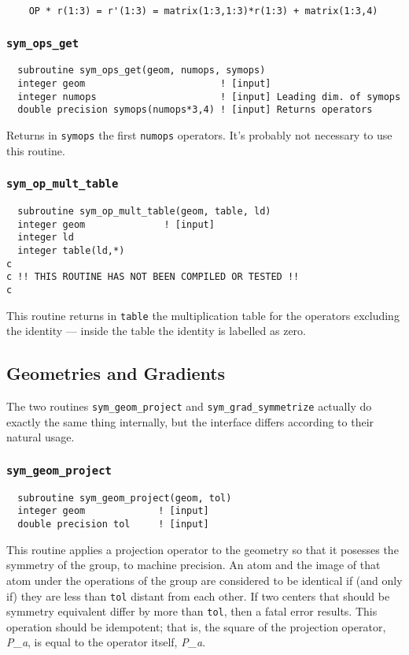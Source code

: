 \begin{verbatim}
    OP * r(1:3) = r'(1:3) = matrix(1:3,1:3)*r(1:3) + matrix(1:3,4)
\end{verbatim}

\subsubsection{{\tt sym\_ops\_get}}
\begin{verbatim}
  subroutine sym_ops_get(geom, numops, symops)
  integer geom                        ! [input]
  integer numops                      ! [input] Leading dim. of symops
  double precision symops(numops*3,4) ! [input] Returns operators
\end{verbatim}
Returns in \verb+symops+ the first \verb+numops+ operators.  It's 
probably not necessary to use this routine.

\subsubsection{{\tt sym\_op\_mult\_table}}
\begin{verbatim}
  subroutine sym_op_mult_table(geom, table, ld)
  integer geom              ! [input]
  integer ld
  integer table(ld,*)
c
c !! THIS ROUTINE HAS NOT BEEN COMPILED OR TESTED !!
c
\end{verbatim}
This routine returns in \verb+table+ the multiplication table for the operators
excluding the identity --- inside the table the identity is labelled
as zero.

\subsection{Geometries and Gradients}

The two routines {\tt sym\_geom\_project} and {\tt sym\_grad\_symmetrize} 
 actually do exactly the same thing internally, but the
interface differs according to their natural usage.

\subsubsection{{\tt sym\_geom\_project}}
\begin{verbatim}
  subroutine sym_geom_project(geom, tol)
  integer geom             ! [input]
  double precision tol     ! [input]
\end{verbatim}

This routine applies a projection operator to the geometry so that it posesses the
symmetry of the group, to machine precision.  An atom and the image of
that atom under the operations of the group are considered to be
identical if (and only if) they are less than \verb+tol+ distant from each
other.  If two centers that should be symmetry equivalent differ
by more than \verb+tol+, then a fatal error results.  This operation
should be idempotent; that is, the square of the projection operator, {\em P\_a}, is 
equal to the operator itself, {\em P\_a}.

